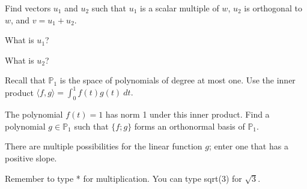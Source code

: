 Find vectors $u_1$ and $u_2$ such that $u_1$ is a scalar multiple of $w$, 
$u_2$ is orthogonal to $w$, and $v = u_1 + u_2.$  




What is $u_1$?


What is $u_2$?




\endedxproblem





Recall that $\mathbb{P}_1$ is the space of polynomials of degree at most one.  
Use the inner product $\langle f, g \rangle = \int_0^1 f(t)g(t) \ dt.$

The polynomial $f(t) = 1$ has norm 1 under this inner product.  Find a polynomial $g \in \mathbb{P}_1$ such that
$\{f; g\}$ forms an orthonormal basis of $\mathbb{P}_1$.  

There are multiple possibilities for the linear function $g$; enter one that has a positive slope.  

Remember to type * for multiplication.  You can type sqrt(3) for $\sqrt{3}$.  






